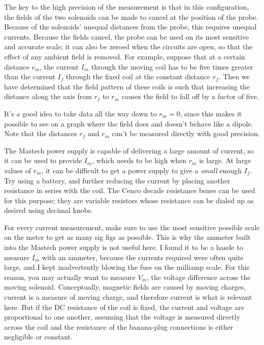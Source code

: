 The key to the high precision of the measurement is that in this configuration, the
fields of the two solenoids can be made to cancel at the position of the probe. Because
of the solenoids' unequal distances from the probe, this requires unequal currents.
Because the fields cancel, the probe can be used on its most sensitive and accurate
scale; it can also be zeroed when the circuits are open, so that the effect of any
ambient field is removed. For example, suppose that at a certain distance $r_m$,
the current $I_m$ through the moving coil has to be five times greater than the current
$I_f$ through the fixed coil at the constant distance $r_f$. Then we have determined that
the field pattern of these coils is such that increasing the distance along the axis
from $r_f$ to $r_m$ causes the field to fall off by a factor of five.

It's a good idea to take data all the way down to $r_m=0$, since this makes it possible
to see on a graph where the field does and doesn't behave like a dipole. Note that the
distances $r_f$ and $r_m$ can't be measured directly with good precision.

The Mastech power supply is capable of delivering a large amount of current, so it can
be used to provide $I_m$, which needs to be high when $r_m$ is large.
At large values of $r_m$, it can be difficult to get a power supply
to give a \emph{small} enough $I_f$. Try using a battery, and further reducing
the current by placing another resistance in series with the coil. The Cenco
decade resistance boxes can be used for this purpose; they are variable resistors
whose resistance can be dialed up as desired using decimal knobs.

For every current measurement, make sure to use the most sensitive possible scale
on the meter to get as many sig figs as possible. This is why the ammeter built into
the Mastech power supply is not useful here.
I found it to be a hassle to measure $I_m$ with an ammeter, because the currents
required were often quite large, and I kept inadvertently blowing the fuse on
the milliamp scale. For this reason, you may actually want to measure $V_m$, the
voltage difference across the moving solenoid. Conceptually, magnetic fields
are caused by moving charges, current is a measure of moving charge, and therefore
current is what is relevant here. But if the DC resistance of the coil is
fixed, the current and voltage are proportional to one another, assuming that the
voltage is measured directly across the coil and the resistance of the banana-plug
connections is either negligible or constant.

